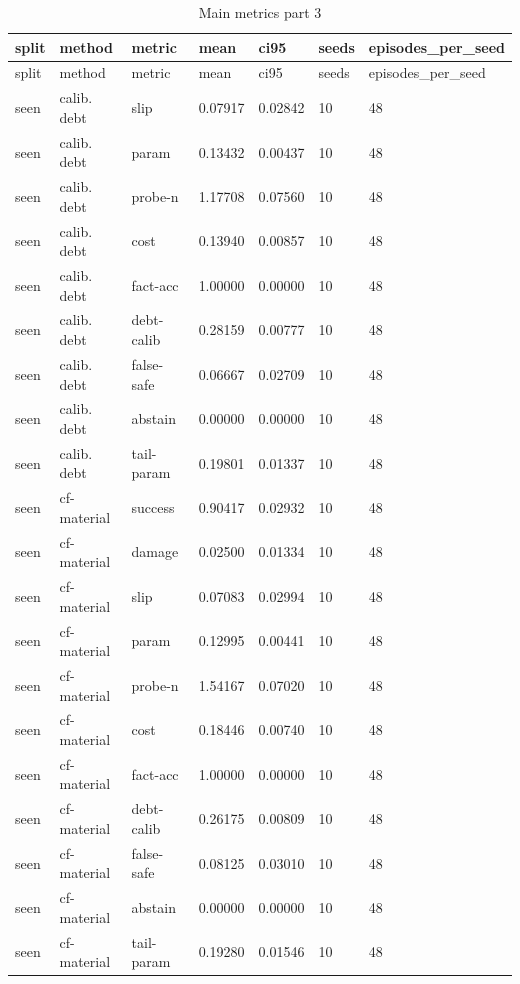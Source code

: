 \documentclass{article}
\begin{document}
\begin{center}
\tiny
\renewcommand{\arraystretch}{0.92}
\setlength{\tabcolsep}{3pt}
\begin{longtable}{lllllll}
\caption{Main metrics part 3}\label{tab:main-metrics-3}\\
\toprule
split & method & metric & mean & ci95 & seeds & episodes\_per\_seed \\
\midrule
\endfirsthead
\toprule
split & method & metric & mean & ci95 & seeds & episodes\_per\_seed \\
\midrule
\endhead
seen & calib. debt & slip & 0.07917 & 0.02842 & 10 & 48 \\
seen & calib. debt & param & 0.13432 & 0.00437 & 10 & 48 \\
seen & calib. debt & probe-n & 1.17708 & 0.07560 & 10 & 48 \\
seen & calib. debt & cost & 0.13940 & 0.00857 & 10 & 48 \\
seen & calib. debt & fact-acc & 1.00000 & 0.00000 & 10 & 48 \\
seen & calib. debt & debt-calib & 0.28159 & 0.00777 & 10 & 48 \\
seen & calib. debt & false-safe & 0.06667 & 0.02709 & 10 & 48 \\
seen & calib. debt & abstain & 0.00000 & 0.00000 & 10 & 48 \\
seen & calib. debt & tail-param & 0.19801 & 0.01337 & 10 & 48 \\
seen & cf-material & success & 0.90417 & 0.02932 & 10 & 48 \\
seen & cf-material & damage & 0.02500 & 0.01334 & 10 & 48 \\
seen & cf-material & slip & 0.07083 & 0.02994 & 10 & 48 \\
seen & cf-material & param & 0.12995 & 0.00441 & 10 & 48 \\
seen & cf-material & probe-n & 1.54167 & 0.07020 & 10 & 48 \\
seen & cf-material & cost & 0.18446 & 0.00740 & 10 & 48 \\
seen & cf-material & fact-acc & 1.00000 & 0.00000 & 10 & 48 \\
seen & cf-material & debt-calib & 0.26175 & 0.00809 & 10 & 48 \\
seen & cf-material & false-safe & 0.08125 & 0.03010 & 10 & 48 \\
seen & cf-material & abstain & 0.00000 & 0.00000 & 10 & 48 \\
seen & cf-material & tail-param & 0.19280 & 0.01546 & 10 & 48 \\

\end{longtable}
\end{center}
\end{document}
